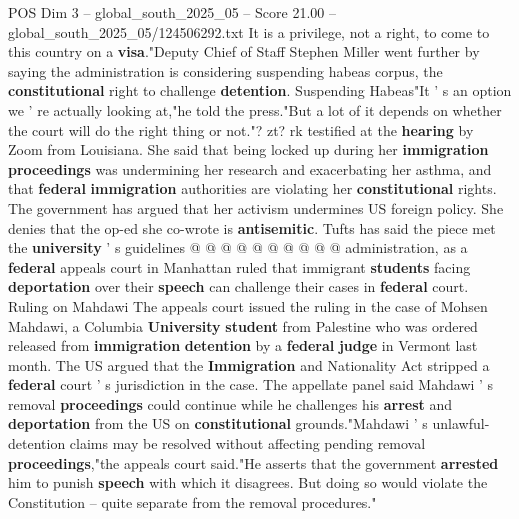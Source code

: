 \begin{textsample}{POS Dim 3 – global\_south\_2025\_05 – Score 21.00 – global\_south\_2025\_05/124506292.txt}
It is a privilege, not a right, to come to this country on a \textbf{visa}."Deputy Chief of Staff Stephen Miller went further by saying the administration is considering suspending habeas corpus, the \textbf{constitutional} right to challenge \textbf{detention}.
Suspending Habeas"It ' s an option we ' re actually looking at,"he told the press."But a lot of it depends on whether the court will do the right thing or not."? zt? rk testified at the \textbf{hearing} by Zoom from Louisiana.
She said that being locked up during her \textbf{immigration} \textbf{proceedings} was undermining her research and exacerbating her asthma, and that \textbf{federal} \textbf{immigration} authorities are violating her \textbf{constitutional} rights.
The government has argued that her activism undermines US foreign policy.
She denies that the op-ed she co-wrote is \textbf{antisemitic}.
Tufts has said the piece met the \textbf{university} ' s guidelines @ @ @ @ @ @ @ @ @ @ administration, as a \textbf{federal} appeals court in Manhattan ruled that immigrant \textbf{students} facing \textbf{deportation} over their \textbf{speech} can challenge their cases in \textbf{federal} court.
Ruling on Mahdawi The appeals court issued the ruling in the case of Mohsen Mahdawi, a Columbia \textbf{University} \textbf{student} from Palestine who was ordered released from \textbf{immigration} \textbf{detention} by a \textbf{federal} \textbf{judge} in Vermont last month.
The US argued that the \textbf{Immigration} and Nationality Act stripped a \textbf{federal} court ' s jurisdiction in the case.
The appellate panel said Mahdawi ' s removal \textbf{proceedings} could continue while he challenges his \textbf{arrest} and \textbf{deportation} from the US on \textbf{constitutional} grounds."Mahdawi ' s unlawful-detention claims may be resolved without affecting pending removal \textbf{proceedings},"the appeals court said."He asserts that the government \textbf{arrested} him to punish \textbf{speech} with which it disagrees.
But doing so would violate the Constitution -- quite separate from the removal procedures."

\end{textsample}
